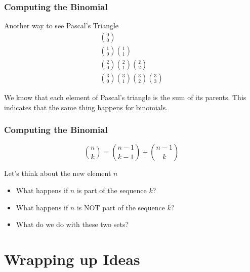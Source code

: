 \documentclass{beamer}
\begin{document}
\begin{frame}
  \frametitle{Computing the Binomial}
  \begin{block}{Another way to see Pascal's Triangle}
    \begin{eqnarray*}
      \binom{0}{0}\\
      \binom{1}{0} \binom{1}{1}\\
      \binom{2}{0} \binom{2}{1} \binom{2}{2}\\
      \binom{3}{0} \binom{3}{1} \binom{3}{2} \binom{3}{3}
    \end{eqnarray*}
  \end{block}
  \begin{block}{}
    We know that each element of Pascal's triangle is the sum of its
    parents. This indicates that the same thing happens for binomials.
  \end{block}
\end{frame}

\begin{frame}
  \frametitle{Computing the Binomial}
  \begin{equation*}
    \binom{n}{k} = \binom{n-1}{k-1} + \binom{n-1}{k}
  \end{equation*}
  \begin{block}{}
    Let's think about the new element $n$
    \begin{itemize}
    \item What happens if $n$ is part of the sequence $k$?
    \item What happens if $n$ is NOT part of the sequence $k$?
    \item What do we do with these two sets?
    \end{itemize}
  \end{block}
\end{frame}
  
\section{Wrapping up Ideas}
\end{document}
